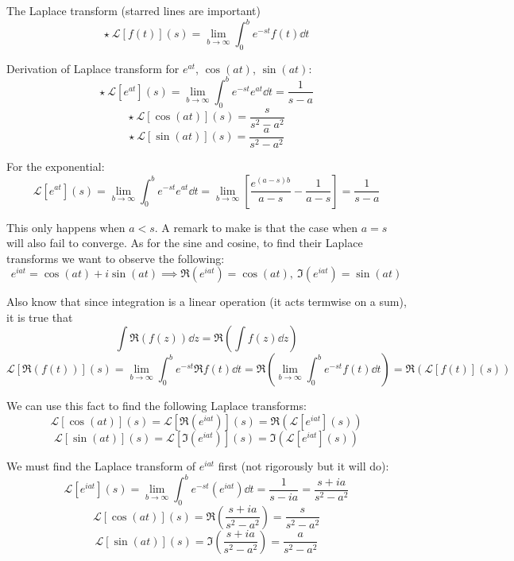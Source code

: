 \documentclass[11pt]{article}
\newcommand{\br}[1]{\left(#1\right)}
\newcommand{\sbr}[1]{\left[#1\right]}
\begin{document}
The Laplace transform (starred lines are important)
$$\star ~\mathcal{L}[f(t)](s) = \lim_{b\to \infty}\int_0^{b}e^{-st}f(t)\dd{t}$$

Derivation of Laplace transform for $e^{at}$, $\cos(at)$, $\sin(at)$:
$$\star ~\mathcal{L}[e^{at}](s) = \lim_{b\to \infty}\int_0^b e^{-st}e^{at}\dd{t} = \frac{1}{s-a}$$
$$\star ~\mathcal{L}[\cos(at)](s) = \frac{s}{s^2-a^2}$$
$$\star ~\mathcal{L}[\sin(at)](s) = \frac{a}{s^2-a^2}$$

For the exponential:
$$\mathcal{L}[e^{at}](s) = \lim_{b\to \infty}\int_0^b e^{-st}e^{at}\dd{t} = \lim_{b\to \infty}\sbr{ \frac{e^{(a-s)b}}{a-s}-\frac{1}{a-s}} = \frac{1}{s-a}$$

This only happens when $a<s$. A remark to make is that the case when $a = s$ will also fail to converge.
As for the sine and cosine, to find their Laplace transforms we want to observe the following:
$$e^{iat} = \cos(at) + i\sin(at)\implies  \Re\br{e^{iat}} = \cos(at), ~ \Im\br{e^{iat}} = \sin(at)$$

Also know that since integration is a linear operation (it acts termwise on a sum), it is true that
$$\int \Re\br{f(z)}\dd{z} = \Re\br{\int f(z)\dd{z}}$$
$$\mathcal{L}[\Re\br{f(t)}](s) = \lim_{b\to \infty}\int_0^{b}e^{-st}\Re{f(t)}\dd{t} = \Re\br{\lim_{b\to \infty}\int_0^{b}e^{-st}f(t)\dd{t}} = \Re\br{\mathcal{L}[f(t)](s)}$$

We can use this fact to find the following Laplace transforms:
$$\mathcal{L}[\cos(at)](s) = \mathcal{L}[\Re\br{e^{iat}}](s) = \Re\br{ \mathcal{L}[e^{iat}](s)}$$
$$\mathcal{L}[\sin(at)](s) = \mathcal{L}[\Im\br{e^{iat}}](s) = \Im\br{ \mathcal{L}[e^{iat}](s)}$$

We must find the Laplace transform of $e^{iat}$ first (not rigorously but it will do):
$$\mathcal{L}[e^{iat}](s) = \lim_{b\to \infty}\int_{0}^{b}e^{-st} \br{e^{iat}}\dd{t} = \frac{1}{s-ia} = \frac{s+ia}{s^2-a^2}$$
$$\mathcal{L}[\cos(at)](s) = \Re\br{\frac{s+ia}{s^2-a^2}} = \frac{s}{s^2-a^2}$$
$$\mathcal{L}[\sin(at)](s) = \Im\br{\frac{s+ia}{s^2-a^2}} = \frac{a}{s^2-a^2}$$
\end{document}
